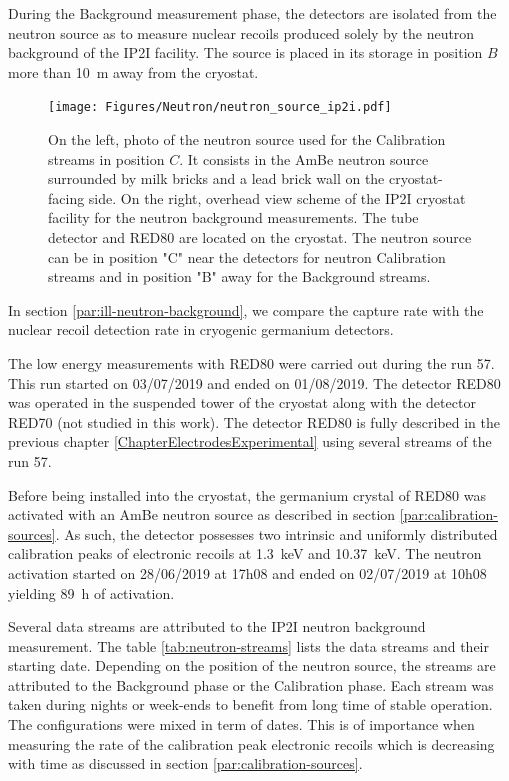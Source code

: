 During the Background measurement phase, the detectors are isolated from the neutron source as to measure nuclear recoils produced solely by the neutron background of the IP2I facility. The source is placed in its storage in position $B$ more than \SI{10}{\m} away from the cryostat.

\begin{figure}
\centering
\texttt{[image: Figures/Neutron/neutron\_source\_ip2i.pdf]}
\caption{On the left, photo of the neutron source used for the Calibration streams in position $C$. It consists in the AmBe neutron source surrounded by milk bricks and a lead brick wall on the cryostat-facing side. On the right, overhead view scheme of the IP2I cryostat facility for the neutron background measurements. The  tube detector and RED80 are located on the cryostat. The neutron source can be in position "C"  near the detectors for neutron Calibration streams and in position "B" away for the Background streams.}
\label{fig:scheme-ip2i}
\end{figure}

In section \ref{par:ill-neutron-background}, we compare the  capture rate with the nuclear recoil detection rate in cryogenic germanium detectors.

The low energy measurements with RED80 were carried out during the run 57. This run started on 03/07/2019 and ended on 01/08/2019. The detector RED80 was operated in the suspended tower of the cryostat along with the detector RED70 (not studied in this work). The detector RED80 is fully described in the previous chapter \ref{ChapterElectrodesExperimental} using several streams of the run 57.

Before being installed into the cryostat, the germanium crystal of RED80 was activated with an AmBe neutron source as described in section \ref{par:calibration-sources}. As such, the detector possesses two intrinsic and uniformly distributed calibration peaks of electronic recoils at \SI{1.3}{\kilo\eV} and \SI{10.37}{\kilo\eV}. The neutron activation started on 28/06/2019 at 17h08 and ended on 02/07/2019 at 10h08 yielding \SI{89}{\hour} of activation.

Several data streams are attributed to the IP2I neutron background measurement. The table \ref{tab:neutron-streams} lists the data streams and their starting date. Depending on the position of the neutron source, the streams are attributed to the Background phase or the Calibration phase.
Each stream was taken during nights or week-ends to benefit from long time of stable operation. The configurations were mixed in term of dates. This is of importance when measuring the rate of the calibration peak electronic recoils which is decreasing with time as discussed in section \ref{par:calibration-sources}.

